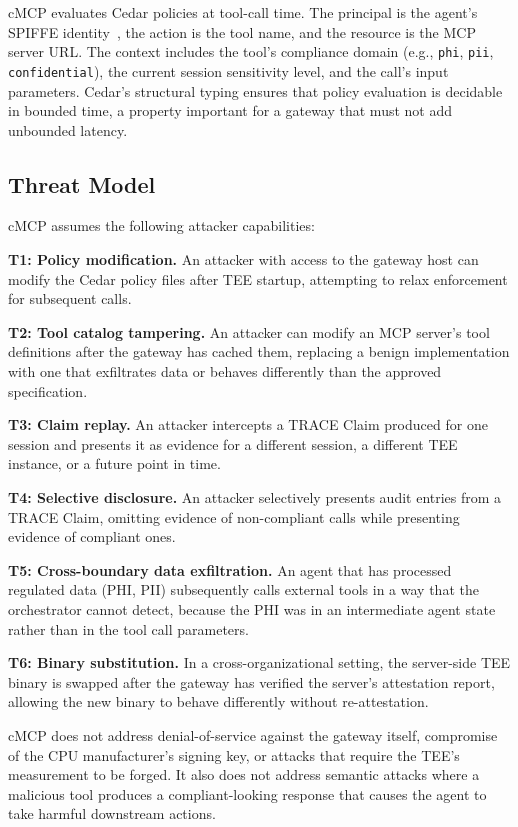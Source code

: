 cMCP evaluates Cedar policies at tool-call time. The principal is the agent's SPIFFE
identity~\citep{spiffe2018}, the action is the tool name, and the resource is the MCP server
URL. The context includes the tool's compliance domain (e.g., \texttt{phi}, \texttt{pii},
\texttt{confidential}), the current session sensitivity level, and the call's input
parameters. Cedar's structural typing ensures that policy evaluation is decidable in
bounded time, a property important for a gateway that must not add unbounded latency.

\subsection{Threat Model}

cMCP assumes the following attacker capabilities:

\textbf{T1: Policy modification.} An attacker with access to the gateway host can modify
the Cedar policy files after TEE startup, attempting to relax enforcement for subsequent
calls.

\textbf{T2: Tool catalog tampering.} An attacker can modify an MCP server's tool
definitions after the gateway has cached them, replacing a benign implementation with one
that exfiltrates data or behaves differently than the approved specification.

\textbf{T3: Claim replay.} An attacker intercepts a TRACE Claim produced for one session
and presents it as evidence for a different session, a different TEE instance, or a future
point in time.

\textbf{T4: Selective disclosure.} An attacker selectively presents audit entries from a
TRACE Claim, omitting evidence of non-compliant calls while presenting evidence of compliant
ones.

\textbf{T5: Cross-boundary data exfiltration.} An agent that has processed regulated data
(PHI, PII) subsequently calls external tools in a way that the orchestrator cannot detect,
because the PHI was in an intermediate agent state rather than in the tool call parameters.

\textbf{T6: Binary substitution.} In a cross-organizational setting, the server-side TEE
binary is swapped after the gateway has verified the server's attestation report, allowing
the new binary to behave differently without re-attestation.

cMCP does not address denial-of-service against the gateway itself, compromise of the CPU
manufacturer's signing key, or attacks that require the TEE's measurement to be forged. It
also does not address semantic attacks where a malicious tool produces a compliant-looking
response that causes the agent to take harmful downstream actions.
